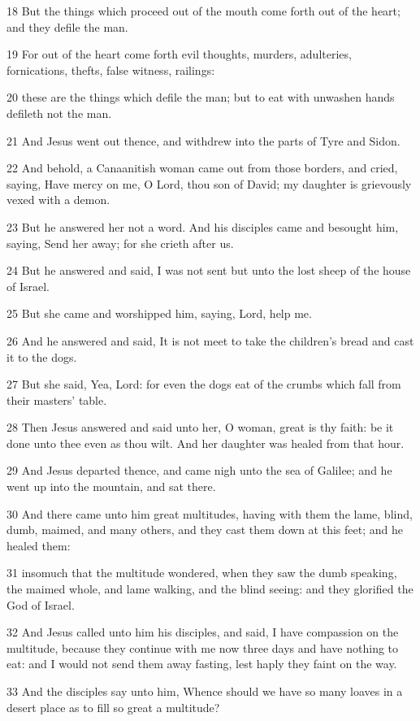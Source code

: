 \par 18 But the things which proceed out of the mouth come forth out of the heart; and they defile the man.
\par 19 For out of the heart come forth evil thoughts, murders, adulteries, fornications, thefts, false witness, railings:
\par 20 these are the things which defile the man; but to eat with unwashen hands defileth not the man.
\par 21 And Jesus went out thence, and withdrew into the parts of Tyre and Sidon.
\par 22 And behold, a Canaanitish woman came out from those borders, and cried, saying, Have mercy on me, O Lord, thou son of David; my daughter is grievously vexed with a demon.
\par 23 But he answered her not a word. And his disciples came and besought him, saying, Send her away; for she crieth after us.
\par 24 But he answered and said, I was not sent but unto the lost sheep of the house of Israel.
\par 25 But she came and worshipped him, saying, Lord, help me.
\par 26 And he answered and said, It is not meet to take the children's bread and cast it to the dogs.
\par 27 But she said, Yea, Lord: for even the dogs eat of the crumbs which fall from their masters' table.
\par 28 Then Jesus answered and said unto her, O woman, great is thy faith: be it done unto thee even as thou wilt. And her daughter was healed from that hour.
\par 29 And Jesus departed thence, and came nigh unto the sea of Galilee; and he went up into the mountain, and sat there.
\par 30 And there came unto him great multitudes, having with them the lame, blind, dumb, maimed, and many others, and they cast them down at this feet; and he healed them:
\par 31 insomuch that the multitude wondered, when they saw the dumb speaking, the maimed whole, and lame walking, and the blind seeing: and they glorified the God of Israel.
\par 32 And Jesus called unto him his disciples, and said, I have compassion on the multitude, because they continue with me now three days and have nothing to eat: and I would not send them away fasting, lest haply they faint on the way.
\par 33 And the disciples say unto him, Whence should we have so many loaves in a desert place as to fill so great a multitude?
